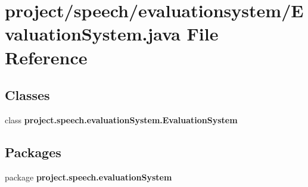 \section{project/speech/evaluationsystem/\+Evaluation\+System.java File Reference}
\label{_evaluation_system_8java}
\subsection*{Classes}
\begin{DoxyCompactItemize}
\item 
class {\bf project.\+speech.\+evaluation\+System.\+Evaluation\+System}
\end{DoxyCompactItemize}
\subsection*{Packages}
\begin{DoxyCompactItemize}
\item 
package {\bf project.\+speech.\+evaluation\+System}
\end{DoxyCompactItemize}
